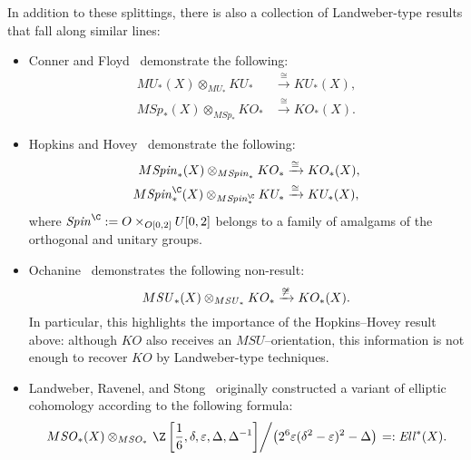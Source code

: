 In addition to these splittings, there is also a collection of Landweber-type results that fall along similar lines:
\begin{itemize}
    \item Conner and Floyd~\cite{ConnerFloyd} demonstrate the following:
    \begin{align*}
    MU_*(X) \otimes_{MU_*} KU_* & \xrightarrow\cong KU_*(X), \\
    M\mathit{Sp}_*(X) \otimes_{M\mathit{Sp}_*} KO_* & \xrightarrow\cong KO_*(X).
    \end{align*}
    \item Hopkins and Hovey~\cite[Theorem 1]{HopkinsHovey} demonstrate the following:
    \begin{align*}
    M\Spin_*(X) \otimes_{M\Spin_*} KO_* & \xrightarrow\cong KO_*(X), \\
    M\Spin^{\C}_*(X) \otimes_{M\Spin^{\C}_*} KU_* & \xrightarrow\cong KU_*(X),
    \end{align*}
    where \(\Spin^{\C} := O \times_{O[0, 2]} U[0, 2]\) belongs to a family of amalgams of the orthogonal and unitary groups.
    \item Ochanine~\cite{OchanineSUModules} demonstrates the following non-result: \[M\mathit{SU}_*(X) \otimes_{M\mathit{SU}_*} KO_* \xrightarrow{\not\cong} KO_*(X).\]  In particular, this highlights the importance of the Hopkins--Hovey result above: although \(KO\) also receives an \(MSU\)--orientation, this information is not enough to recover \(KO\) by Landweber-type techniques.
    \item Landweber, Ravenel, and Stong~\cite{LandweberEll,LRS} originally constructed a variant of elliptic cohomology according to the following formula:  \[M\SO_*(X) \otimes_{M\SO_*} \left.\Z\left[\frac{1}{6}, \delta, \eps, \Delta, \Delta^{-1}\right] \middle/ \left(2^6 \eps (\delta^2 - \eps)^2 - \Delta\right)\right. =: \mathit{Ell}^*(X).\]
\end{itemize}

